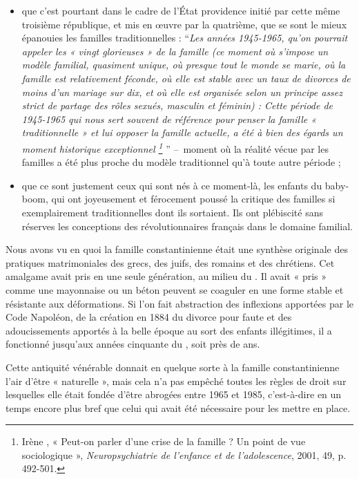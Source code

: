 \begin{itemize}
\item que c'est pourtant dans le cadre de l'État providence initié par cette même troisième république, et mis en œuvre par la quatrième, que se sont le mieux épanouies les familles traditionnelles : \enquote{\emph{Les années 1945-1965, qu'on pourrait appeler les « vingt glorieuses » de la famille (ce moment où s'impose un modèle familial, quasiment unique, où presque tout le monde se marie, où la famille est relativement féconde, où elle est stable avec un taux de divorces de moins d'un mariage sur dix, et où elle est organisée selon un principe assez strict de partage des rôles sexués, masculin et féminin) : Cette période de 1945-1965 qui nous sert souvent de référence pour penser la famille « traditionnelle » et lui opposer la famille actuelle, a été à bien des égards un moment historique exceptionnel%
\footnote{Irène , « Peut-on parler d'une crise de la famille ? Un point de vue sociologique », \emph{Neuropsychiatrie de l'enfance et de l'adolescence}, 2001, 49, p. 492-501.}%
}} \mbox{-- }moment où la réalité vécue par les familles a été plus proche du modèle traditionnel qu'à toute autre période ;

\item que ce sont justement ceux qui sont nés à ce moment-là, les enfants du baby-boom, qui ont joyeusement et férocement poussé la critique des familles si exemplairement traditionnelles dont ils sortaient. Ils ont plébiscité sans réserves les conceptions des révolutionnaires français dans le domaine familial.
 
\end{itemize}
 
 Nous avons vu en quoi la famille constantinienne était une synthèse originale des pratiques matrimoniales des grecs, des juifs, des romains et des chrétiens. Cet amalgame avait pris en une seule génération, au milieu du . Il avait « pris » comme une mayonnaise ou un béton peuvent se coaguler en une forme stable et résistante aux déformations.  Si l'on fait abstraction des inflexions apportées par le Code Napoléon, de la création en 1884 du divorce pour faute et des adoucissements apportés à la belle époque au sort des enfants illégitimes, il a fonctionné jusqu'aux années cinquante du , soit près de  ans. 
 
 Cette antiquité vénérable donnait en quelque sorte à la famille constantinienne l'air d'être « naturelle », mais cela n'a pas empêché toutes les règles de droit sur lesquelles elle était fondée d'être abrogées entre 1965 et 1985, c'est-à-dire en un temps encore plus bref que celui qui avait été nécessaire pour les mettre en place. 
 
